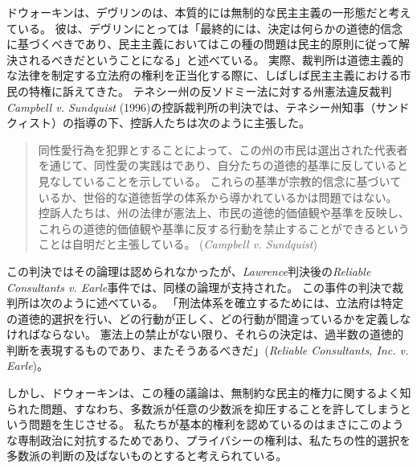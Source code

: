 \documentclass[paper=a4,book,openany]{jlreq}
\newcommand{\ig}[1]{}           %
\begin{document}
ドウォーキン\ig{Ronald Dworkin}は、デヴリン\ig{Patrick Devlin}のは、本質的には無制的な民主主義の一形態だと考えている。
彼は、デヴリン\ig{Patrick Devlin}にとっては「最終的には、決定は何らかの道徳的信念に基づくべきであり、民主主義においてはこの種の問題は民主的原則に従って解決されるべきだということになる」と述べている\citep[pp. 246--247]{dworkin77:_takin_right_serious}。
実際、裁判所は道徳主義的な法律を制定する立法府の権利を正当化する際に、しばしば民主主義における市民の特権に訴えてきた。
テネシー州の反ソドミー法に対する州憲法違反裁判 \emph{Campbell v. Sundquist} (1996)の控訴裁判所の判決では、テネシー州知事（サンドクィスト）の指導の下、控訴人たちは次のように主張した。

\begin{quote}
同性愛行為を犯罪とすることによって、この州の市民は選出された代表者を通じて、同性愛の実践はであり、自分たちの道徳的基準に反していると見なしていることを示している。
これらの基準が宗教的信念に基づいているか、世俗的な道徳哲学の体系から導かれているかは問題ではない。
控訴人たちは、州の法律が憲法上、市民の道徳的価値観や基準を反映し、これらの道徳的価値観や基準に反する行動を禁止することができるということは自明だと主張している。
(\emph{Campbell v. Sundquist}\ig{, 926 SW 2d 250, Tenn: Court of Appeals, Western Section 1996})
\end{quote}

この判決ではその論理は認められなかったが、\emph{Lawrence}判決後の\emph{Reliable Consultants v. Earle}事件では、同様の論理が支持された。
この事件の判決で裁判所は次のように述べている。
「刑法体系を確立するためには、立法府は特定の道徳的選択を行い、どの行動が正しく、どの行動が間違っているかを定義しなければならない。
憲法上の禁止がない限り、それらの決定は、過半数の道徳的判断を表現するものであり、またそうあるべきだ」(\emph{Reliable Consultants, Inc. v. Earle}\ig{, 517 F.3d 738, 2008})。

しかし、ドウォーキン\ig{Ronald Dworkin}は、この種の議論は、無制約な民主的権力に関するよく知られた問題、すなわち、多数派が任意の少数派を抑圧することを許してしまうという問題を生じさせる。
私たちが基本的権利を認めているのはまさにこのような専制政治に対抗するためであり、プライバシーの権利は、私たちの性的選択を多数派の判断の及ばないものとすると考えられている。
\end{document}
